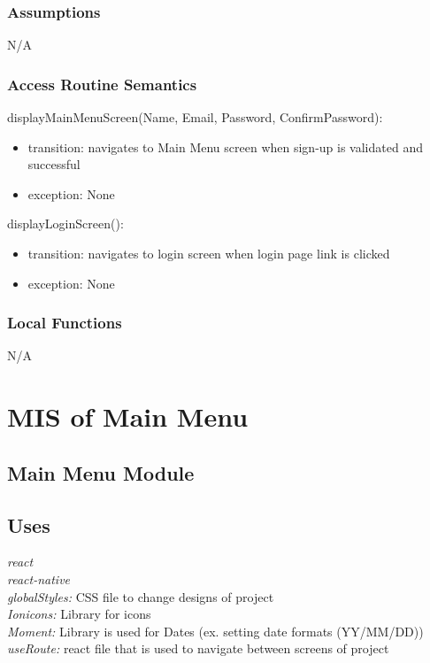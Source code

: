 \documentclass[12pt, titlepage]{article}
\begin{document}
\subsubsection{Assumptions}

N/A

\subsubsection{Access Routine Semantics}

\noindent displayMainMenuScreen(Name, Email, Password, ConfirmPassword):
\begin{itemize}
	\item transition: navigates to Main Menu screen when sign-up is validated and successful
	\item exception: None 
\end{itemize}

\noindent displayLoginScreen():
\begin{itemize}
	\item transition: navigates to login screen when login page link is clicked
	\item exception: None 
\end{itemize}

\subsubsection{Local Functions}
N/A

\section{MIS of Main Menu} \label{Module} 

\subsection{Main Menu Module}

\subsection{Uses}
{\textit{react}}\\
{\textit{react-native}}\\
{\textit{globalStyles:} CSS file to change designs of project}\\
{\textit{Ionicons:} Library for icons}\\
{\textit{Moment:} Library is used for Dates (ex. setting date formats (YY/MM/DD))}\\
{\textit{useRoute:} react file that is used to navigate between screens of project}\\
\end{document}
